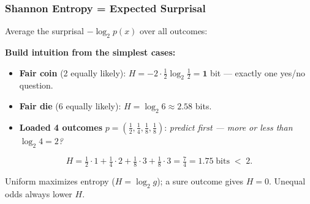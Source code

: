 \documentclass[aspectratio=169]{beamer}
\begin{document}
\begin{frame}
\frametitle{Shannon Entropy = Expected Surprisal}

\small
Average the surprisal $-\log_2 p(x)$ over all outcomes:

\vspace{0.05cm}
\begin{center}
\end{center}

\vspace{0.05cm}
\textbf{Build intuition from the simplest cases:}
\begin{itemize}\setlength{\itemsep}{2pt}
  \item \textbf{Fair coin} (2 equally likely): $H = -2\cdot\tfrac{1}{2}\log_2\tfrac{1}{2} = \mathbf{1}$ bit --- exactly one yes/no question.
  \item \textbf{Fair die} (6 equally likely): $H = \log_2 6 \approx \mathbf{2.58}$ bits.
  \item \textbf{Loaded 4 outcomes} $p = (\tfrac{1}{2}, \tfrac{1}{4}, \tfrac{1}{8}, \tfrac{1}{8})$: \;\textit{predict first --- more or less than $\log_2 4 = 2$?}
\end{itemize}

\pause
\vspace{-0.05cm}
$$H = \tfrac{1}{2}\cdot 1 + \tfrac{1}{4}\cdot 2 + \tfrac{1}{8}\cdot 3 + \tfrac{1}{8}\cdot 3 = \boxed{\tfrac{7}{4} = 1.75 \;\text{bits}} \;<\; 2.$$

\vspace{-0.05cm}
\begin{center}
\footnotesize Uniform maximizes entropy ($H = \log_2 g$); a sure outcome gives $H = 0$. Unequal odds always lower $H$.
\end{center}
\end{frame}
\end{document}
